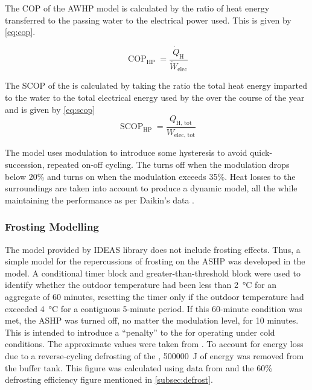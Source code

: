 The \ac{COP} of the \ac{AWHP} model is calculated by the ratio of heat energy transferred to the passing water to the electrical power used. This is given by \cref{eq:cop}. 

\begin{equation}
    \operatorname{COP}_\text{HP}=\frac{\dot{Q}_\text{H}}{\dot{W}_\text{elec}}\label{eq:cop}
\end{equation}

The \ac{SCOP} of the \HP is calculated by taking the ratio the total heat energy imparted to the water to the total electrical energy used by the \HP over the course of the year and is given by \cref{eq:scop}
\begin{equation}
    \operatorname{SCOP}_\text{HP}=\frac{Q_\text{H, tot}}{W_\text{elec, tot}}\label{eq:scop}
\end{equation}

The model uses modulation to introduce some hysteresis to avoid quick-succession, repeated on-off cycling. The \HP turns off when the modulation drops below 20\% and turns on when the modulation exceeds 35\%. Heat losses to the surroundings are taken into account to produce a dynamic model, all the while maintaining the performance as per Daikin's data \cite{daikin_altherma_tech_2006}.

\subsubsection{Frosting Modelling} \label{subsubsec:frostingmod}
The model provided by IDEAS library does not include frosting effects. Thus, a simple model for the repercussions of frosting on the \ac{ASHP} was developed in the \modelica model. A conditional timer block and greater-than-threshold block were used to identify whether the outdoor temperature had been less than \qty{2}{\celsius} for an aggregate of 60 minutes, resetting the timer only if the outdoor temperature had exceeded \qty{4}{\celsius} for a contiguous 5-minute period. If this 60-minute condition was met, the \ac{ASHP} was turned off, no matter the modulation level, for 10 minutes. This is intended to introduce a ``penalty'' to the \HP for operating under cold conditions. The approximate values were taken from \citeauthor{sandstrom_frosting_2021} \cite{sandstrom_frosting_2021}. To account for energy loss due to a reverse-cycling defrosting of the \HP, \qty{500000}{\joule} of energy was removed from the buffer tank. This figure was calculated using data from \citeauthor{sandstrom_frosting_2021} \cite{sandstrom_frosting_2021} and the 60\% defrosting efficiency figure mentioned in \cref{subsec:defrost}. 

